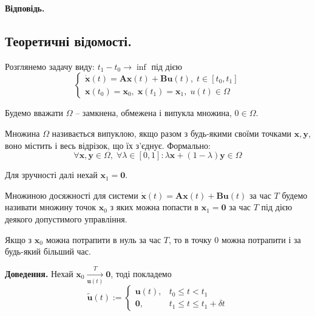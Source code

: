 \documentclass[14pt]{extarticle}
\newcommand{\<}{\langle}
\renewcommand{\>}{\rangle}
\theoremstyle{mystyle}{\newtheorem{definition}{Definition}[section]}
\theoremstyle{mystyle}{\newtheorem{proposition}[definition]{Proposition}}
\theoremstyle{mystyle}{\newtheorem{theorem}[definition]{Theorem}}
\theoremstyle{mystyle}{\newtheorem{lemma}[definition]{Lemma}}
\theoremstyle{mystyle}{\newtheorem{corollary}[definition]{Corollary}}
\theoremstyle{mystyle}{\newtheorem*{remark}{Remark}}
\theoremstyle{mystyle}{\newtheorem*{remarks}{Remarks}}
\theoremstyle{mystyle}{\newtheorem*{example}{Example}}
\theoremstyle{mystyle}{\newtheorem*{examples}{Examples}}
\theoremstyle{definition}{\newtheorem*{exercise}{Exercise}}
\theoremstyle{cstyle}{\newtheorem*{cthm}{}}
\theoremstyle{warn}
\begin{document}
\textbf{Відповідь.} 

\subsection{Теоретичні відомості.}

Розглянемо задачу виду: $t_1-t_0 \to \inf$ під дією
\begin{equation}
    \begin{cases}
        \dot{\mathbf{x}}(t) = \boldsymbol{A}\mathbf{x}(t) + \boldsymbol{B}\mathbf{u}(t), \; t \in [t_0,t_1] \\
        \mathbf{x}(t_0) = \mathbf{x}_0, \; \mathbf{x}(t_1) = \mathbf{x}_1, \; u(t) \in \Omega
    \end{cases}
\end{equation}

Будемо вважати $\Omega$ -- замкнена, обмежена і випукла множина, $0 \in \Omega$.

\begin{definition}
    Множина $\Omega$ називається випуклою, якщо разом з будь-якими своїми точками $\mathbf{x},\mathbf{y}$, воно 
    містить і весь відрізок, що їх з'єднує. Формально:
    \begin{equation}
        \forall \mathbf{x},\mathbf{y} \in \Omega, \; \forall \lambda \in [0,1]: \lambda \mathbf{x} + (1-\lambda)\mathbf{y} \in \Omega
    \end{equation}
\end{definition}

Для зручності далі нехай $\mathbf{x}_1=\mathbf{0}$.

\begin{definition}
    Множиною досяжності для системи $\dot{\mathbf{x}}(t) = \boldsymbol{A}\mathbf{x}(t) + \boldsymbol{B}\mathbf{u}(t)$ за час $T$ будемо називати множину точок $\mathbf{x}_0$ з яких можна попасти в $\mathbf{x}_1=\mathbf{0}$ за час $T$ під дією деякого допустимого управління.
\end{definition}

\begin{lemma}
    Якщо з $\mathbf{x}_0$ можна потрапити в нуль за час $T$, то в точку $0$ можна потрапити і за будь-який більший час. 
\end{lemma}

\textbf{Доведення.} Нехай $\mathbf{x}_0 \xrightarrow[\mathbf{u}(t)]{T} \mathbf{0}$, тоді покладемо
\begin{equation}
    \widetilde{\mathbf{u}}(t) := \begin{cases}
        \mathbf{u}(t), & t_0 \leq t < t_1 \\
        \mathbf{0}, & t_1 \leq t \leq t_1+\delta t
    \end{cases}
\end{equation}
\end{document}
